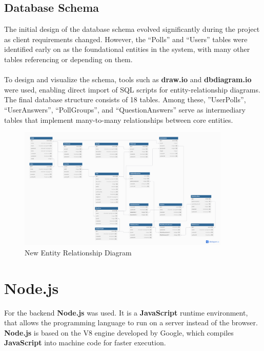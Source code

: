 \documentclass[a4paper,12pt]{report}
\begin{document}
\subsection{Database Schema}
The initial design of the database schema evolved significantly during the project as client requirements changed. However, the “Polls” and “Users” tables were identified early on as the foundational entities in the system, with many other tables referencing or depending on them.\\\\
To design and visualize the schema, tools such as \textbf{draw.io} and \textbf{dbdiagram.io} were used, enabling direct import of SQL scripts for entity-relationship diagrams. The final database structure consists of 18 tables. Among these, ”UserPolls”, “UserAnswers”, “PollGroups”, and “QuestionAnswers” serve as intermediary tables that implement many-to-many relationships between core entities.
\clearpage 
\begin{figure}[!htb]  
    \centering
    \includegraphics[width=0.9\textwidth]{pics/ERD_NEW.png}
    \caption{New Entity Relationship Diagram}
    \label{fig:new_ERD}
\end{figure}
\clearpage 

\section{Node.js}
For the backend \textbf{Node.js} was used. It is a \textbf{JavaScript} runtime environment, that allows the programming language to run on a server instead of the browser. \textbf{Node.js} is based on the V8 engine developed by Google, which compiles \textbf{JavaScript} into machine code for faster execution.\parencite{nodejs-intro}\\\\
\end{document}
